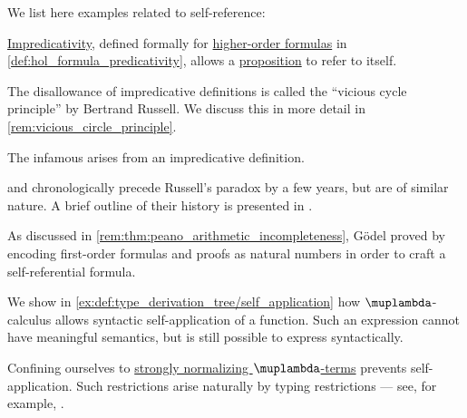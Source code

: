 \begin{example}\label{ex:self_reference}
  We list here examples related to self-reference:
  \begin{thmenum}
     \hyperref[con:impredicative_definition]{Impredicativity}, defined formally for \hyperref[def:hol_expression/formula]{higher-order formulas} in \cref{def:hol_formula_predicativity}, allows a \hyperref[con:proposition]{proposition} to refer to itself.

    The disallowance of impredicative definitions is called the \enquote{vicious cycle principle} by Bertrand Russell. We discuss this in more detail in \cref{rem:vicious_circle_principle}.

     The infamous  arises from an impredicative definition.

     and  chronologically precede Russell's paradox by a few years, but are of similar nature. A brief outline of their history is presented in \cite[36]{Kleene1971Metamathematics}.

     As discussed in \cref{rem:thm:peano_arithmetic_incompleteness}, G\"odel proved  by encoding first-order formulas and proofs as natural numbers in order to craft a self-referential formula.

     We show in \cref{ex:def:type_derivation_tree/self_application} how \( \muplambda \)-calculus allows syntactic self-application of a function. Such an expression cannot have meaningful semantics, but is still possible to express syntactically.

    Confining ourselves to \hyperref[def:strongly_normalizing_lambda_term]{strongly normalizing \( \muplambda \)-terms} prevents self-application. Such restrictions arise naturally by typing restrictions --- see, for example, .
  \end{thmenum}
\end{example}

